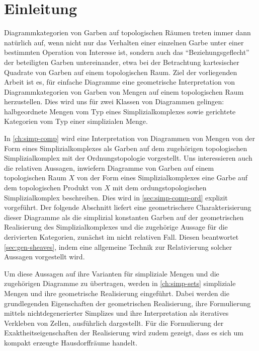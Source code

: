 
\section*{Einleitung}

Diagrammkategorien von Garben auf topologischen Räumen treten immer
dann natürlich auf, wenn nicht nur das Verhalten einer einzelnen Garbe
unter einer bestimmten Operation von Interesse ist, sondern auch das
``Beziehungsgeflecht'' der beteiligten Garben untereinander, etwa bei
der Betrachtung kartesischer Quadrate von Garben auf einem
topologischen Raum. Ziel der vorliegenden Arbeit ist es, für einfache
Diagramme eine geometrische Interpretation von Diagrammkategorien von
Garben von Mengen auf einem topologischen Raum herzustellen. Dies wird
uns für zwei Klassen von Diagrammen gelingen: halbgeordnete Mengen vom
Typ eines Simplizialkomplexes sowie gerichtete Kategorien vom Typ
einer simplizialen Menge.

In \ref{ch:simp-comp} wird eine Interpretation von Diagrammen von
Mengen von der Form eines Simplizialkomplexes als Garben auf dem
zugehörigen topologischen Simplizialkomplex mit der Ordnungstopologie
vorgestellt. Uns interessieren auch die relativen Aussagen, inwiefern
Diagramme von Garben auf einem topologischen Raum $X$ von der Form
eines Simplizialkomplexes eine Garbe auf dem topologischen Produkt von
$X$ mit dem ordungstopologischen Simplizialkomplex beschreiben. Dies
wird in \ref{sec:simp-comp-ord} explizit vorgeführt. Der folgende
Abschnitt liefert eine geometrischere Charakterisierung dieser
Diagramme als die simplizial konstanten Garben auf der geometrischen
Realisierung des Simplizialkomplexes und die zugehörige Aussage für
die derivierten Kategorien, zunächst im nicht relativen Fall. Diesen
beantwortet \ref{sec:gen-sheaves}, indem eine allgemeine Technik zur
Relativierung solcher Aussagen vorgestellt wird.

Um diese Aussagen auf ihre Varianten für simpliziale Mengen und die
zugehörigen Diagramme zu übertragen, werden in \ref{ch:simp-sets}
simpliziale Mengen und ihre geometrische Realisierung
eingeführt. Dabei werden die grundlegenden Eigenschaften der
geometrischen Realisierung, ihre Formulierung mittels
nichtdegenerierter Simplizes und ihre Interpretation als iteratives
Verkleben von Zellen, ausführlich dargestellt. Für die Formulierung
der Exaktheitseigenschaften der Realisierung wird zudem gezeigt, dass
es sich um kompakt erzeugte Hausdorffräume handelt.

